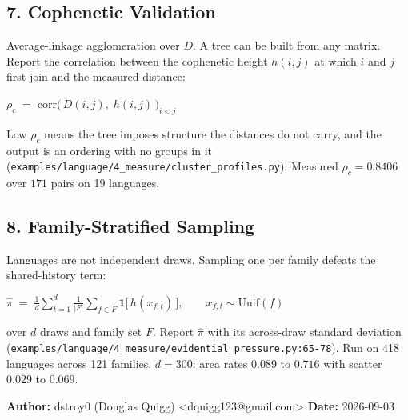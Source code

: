 \subsection{7. Cophenetic Validation}

Average-linkage agglomeration over \(D\). A tree can be built from any matrix. Report the correlation between the cophenetic height \(h(i,j)\) at which \(i\) and \(j\) first join and the measured distance:

\(\rho_c \;=\; \mathrm{corr}\bigl(\,D(i,j),\; h(i,j)\,\bigr)_{i < j}\)

Low \(\rho_c\) means the tree imposes structure the distances do not carry, and the output is an ordering with no groups in it (\texttt{examples/\allowbreak{}language/\allowbreak{}4\_\allowbreak{}measure/\allowbreak{}cluster\_\allowbreak{}profiles.\allowbreak{}py}). Measured \(\rho_c = 0.8406\) over \(171\) pairs on 19 languages.

\subsection{8. Family-Stratified Sampling}

Languages are not independent draws. Sampling one per family defeats the shared-history term:

\(\hat{\pi} \;=\; \frac{1}{d}\sum_{t=1}^{d} \frac{1}{|F|}\sum_{f \in F} \mathbf{1}\bigl[\,h(x_{f,t})\,\bigr], \qquad x_{f,t} \sim \mathrm{Unif}(f)\)

over \(d\) draws and family set \(F\). Report \(\hat{\pi}\) with its across-draw standard deviation (\texttt{examples/\allowbreak{}language/\allowbreak{}4\_\allowbreak{}measure/\allowbreak{}evidential\_\allowbreak{}pressure.\allowbreak{}py:65-\allowbreak{}78}). Run on 418 languages across 121 families, \(d=300\): area rates \(0.089\) to \(0.716\) with scatter \(0.029\) to \(0.069\).

\textbf{Author:} dstroy0 (Douglas Quigg) <dquigg123@gmail.com> \textbf{Date:} 2026-09-03

